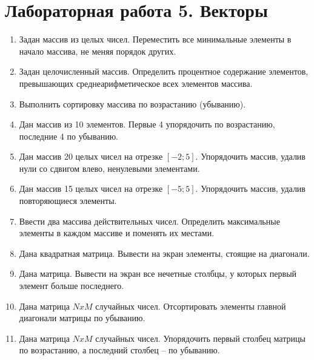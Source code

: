 \section{Лабораторная работа 5. Векторы}
\begin{enumerate}[leftmargin=*]
    \item Задан массив из  целых чисел. Переместить все минимальные элементы в начало массива, не меняя порядок других. 
    \item Задан целочисленный массив. Определить процентное содержание элементов, превышающих среднеарифметическое всех элементов массива.
    \item Выполнить сортировку массива по возрастанию (убыванию).
    \item Дан массив из 10 элементов. Первые 4 упорядочить по возрастанию, последние 4 по убыванию.
    \item Дан массив 20 целых чисел на отрезке $[-2; 5]$. Упорядочить массив, удалив нули со сдвигом влево, ненулевыми элементами.
    \item Дан массив 15 целых чисел на отрезке $[-5; 5]$. Упорядочить массив, удалив повторяющиеся элементы.
    \item Ввести два массива действительных чисел. Определить максимальные элементы в каждом массиве и поменять их местами. 
    \item Дана квадратная матрица. Вывести на экран элементы, стоящие на диагонали.
    \item Дана матрица. Вывести на экран все нечетные столбцы, у которых первый элемент больше последнего.
    \item Дана матрица $NxM$ случайных чисел. Отсортировать элементы главной диагонали матрицы по убыванию.
    \item Дана матрица $NxM$ случайных чисел. Упорядочить первый столбец матрицы по возрастанию, а последний столбец – по убыванию.
\end{enumerate}

